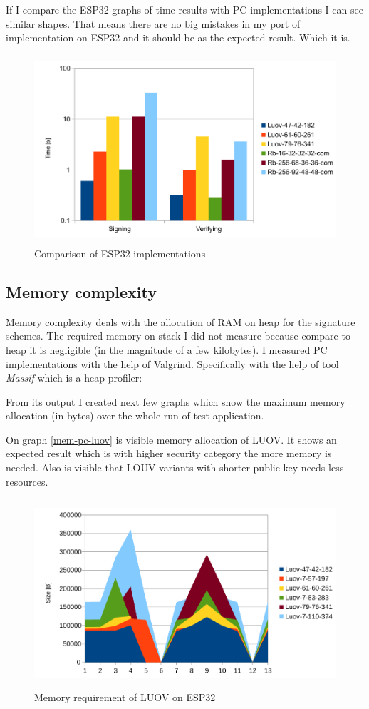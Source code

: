 \documentclass[thesis=M,english]{FITthesis}[2019/12/23]
\begin{document}
\bigskip
\noindent
If I compare the ESP32 graphs of time results with PC implementations I can see similar shapes. That means there are no big mistakes in my port of implementation on ESP32 and it should be as the expected result. Which it is.

\begin{figure}[H]
\centering
\includegraphics[width=13cm,height=7cm]{images/time-both.pdf}
\caption{Comparison of ESP32 implementations}
\label{time-both}
\end{figure}

\subsection{Memory complexity}
Memory complexity deals with the allocation of RAM on heap for the signature schemes. The required memory on stack I did not measure because compare to heap it is negligible (in the magnitude of a few kilobytes). I measured PC implementations with the help of Valgrind. Specifically with the help of tool \textit{Massif} which is a heap profiler:

\noindent
From its output I created next few graphs which show the maximum memory allocation (in bytes) over the whole run of test application. 

\bigskip
\noindent
On graph \ref{mem-pc-luov} is visible memory allocation of LUOV. It shows an expected result which is with higher security category the more memory is needed. Also is visible that LOUV variants with shorter public key needs less resources.

\begin{figure}[H]
\centering
\includegraphics[width=13cm,height=7cm]{images/mem-luov0.pdf}
\caption{Memory requirement of LUOV on ESP32}
\label{mem-luov0}
\end{figure}
\end{document}
